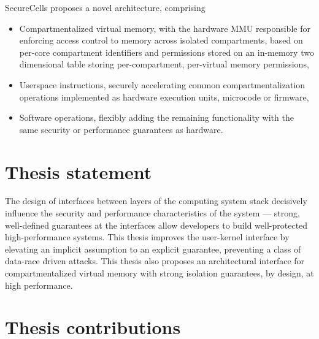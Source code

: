 SecureCells proposes a novel architecture, comprising
\begin{itemize}
  \item Compartmentalized virtual memory, with the hardware MMU responsible for
        enforcing access control to memory across isolated compartments, based on 
        per-core compartment identifiers and permissions stored on an in-memory
        two dimensional table storing per-compartment, per-virtual memory permissions,
  \item Userspace instructions, securely accelerating common compartmentalization 
        operations implemented as hardware execution units, microcode or firmware,
  \item Software operations, flexibly adding the remaining functionality with the
        same security or performance guarantees as hardware.
\end{itemize}





\section{Thesis statement}

The design of interfaces between layers of the computing system stack decisively influence the 
security and performance characteristics of the system --- 
strong, well-defined guarantees at the interfaces allow developers to build well-protected 
high-performance systems.
This thesis improves the user-kernel interface by elevating an implicit assumption to 
an explicit guarantee, preventing a class of data-race driven attacks.
This thesis also proposes an architectural interface for compartmentalized virtual memory
with strong isolation guarantees, by design, at high performance.

\section{Thesis contributions}

